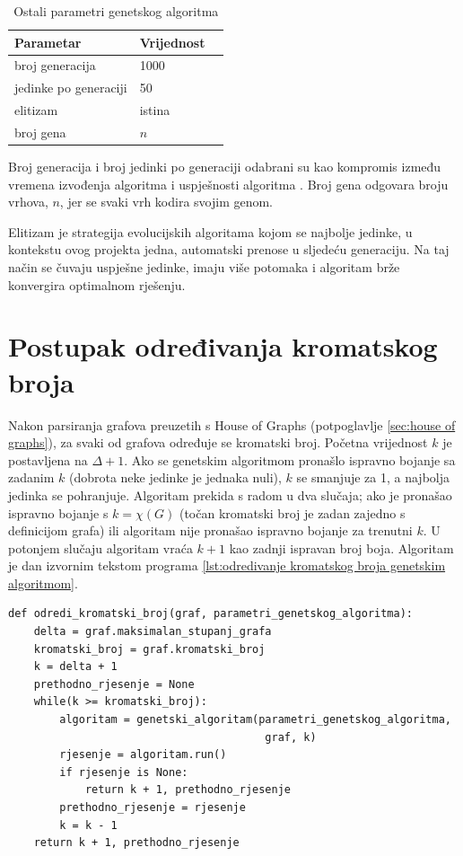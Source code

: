 \documentclass[times, utf8, zavrsni, numeric]{fer}
\begin{document}
\begin{table}[htb]
\caption{Ostali parametri genetskog algoritma}
\label{tbl:ostali parametri genetrskog algoritma}
\centering
\begin{tabular}{llr} \hline
Parametar & Vrijednost\\ \hline
broj generacija & 1000 \\
jedinke po generaciji & 50 \\
elitizam & istina \\
broj gena & $n$ \\ \hline
\end{tabular}
\end{table}

Broj generacija i broj jedinki po generaciji odabrani su kao kompromis između vremena izvođenja algoritma i uspješnosti algoritma \cite{hindi2012genetic}. Broj gena odgovara broju vrhova, $n$, jer se svaki vrh kodira svojim genom. 

Elitizam je strategija evolucijskih algoritama kojom se najbolje jedinke, u kontekstu ovog projekta jedna, automatski prenose u sljedeću generaciju. Na taj način se čuvaju uspješne jedinke, imaju više potomaka i algoritam brže konvergira optimalnom rješenju. 

\section{Postupak određivanja kromatskog broja}
Nakon parsiranja grafova preuzetih s House of Graphs (potpoglavlje \ref{sec:house of graphs}), za svaki od grafova određuje se kromatski broj. Početna vrijednost $k$ je postavljena na $\Delta + 1$. Ako se genetskim algoritmom pronašlo ispravno bojanje sa zadanim $k$ (dobrota neke jedinke je jednaka nuli), $k$ se smanjuje za 1, a najbolja jedinka se pohranjuje. Algoritam prekida s radom u dva slučaja; ako je pronašao ispravno bojanje s $k=\chi(G)$ (točan kromatski broj je zadan zajedno s definicijom grafa) ili algoritam nije pronašao ispravno bojanje za trenutni $k$. U potonjem slučaju algoritam vraća $k+1$ kao zadnji ispravan broj boja. Algoritam je dan izvornim tekstom programa \ref{lst:odredivanje kromatskog broja genetskim algoritmom}.

\begin{lstlisting}[caption=Određivanje kromatskog broja genetskim algoritmom, label={lst:odredivanje kromatskog broja genetskim algoritmom}]
def odredi_kromatski_broj(graf, parametri_genetskog_algoritma):
    delta = graf.maksimalan_stupanj_grafa
    kromatski_broj = graf.kromatski_broj
    k = delta + 1
    prethodno_rjesenje = None
    while(k >= kromatski_broj):
        algoritam = genetski_algoritam(parametri_genetskog_algoritma, 
                                        graf, k)
        rjesenje = algoritam.run()
        if rjesenje is None:
            return k + 1, prethodno_rjesenje
        prethodno_rjesenje = rjesenje
        k = k - 1
    return k + 1, prethodno_rjesenje
\end{lstlisting}
\end{document}
